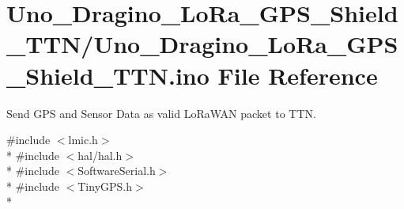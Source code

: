 \hypertarget{Uno__Dragino__LoRa__GPS__Shield__TTN_8ino}{\section{Uno\-\_\-\-Dragino\-\_\-\-Lo\-Ra\-\_\-\-G\-P\-S\-\_\-\-Shield\-\_\-\-T\-T\-N/\-Uno\-\_\-\-Dragino\-\_\-\-Lo\-Ra\-\_\-\-G\-P\-S\-\_\-\-Shield\-\_\-\-T\-T\-N.ino File Reference}
\label{Uno__Dragino__LoRa__GPS__Shield__TTN_8ino}
}


Send G\-P\-S and Sensor Data as valid Lo\-Ra\-W\-A\-N packet to T\-T\-N.  


{\ttfamily \#include $<$lmic.\-h$>$}\\*
{\ttfamily \#include $<$hal/hal.\-h$>$}\\*
{\ttfamily \#include $<$Software\-Serial.\-h$>$}\\*
{\ttfamily \#include $<$Tiny\-G\-P\-S.\-h$>$}\\*
